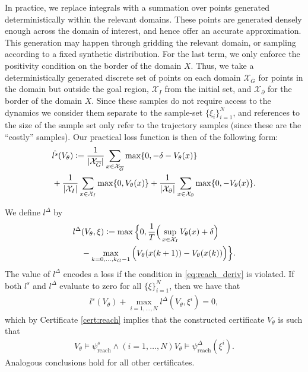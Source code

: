 In practice, we replace integrals with a summation over points generated deterministically within the relevant domains. 
These points are generated densely enough across the domain of interest, and hence offer an accurate approximation. 
This generation may happen through gridding the relevant domain, or sampling according to a fixed synthetic distribution.
For the last term, we only enforce the positivity condition on the border of the domain $X$.
Thus, we take a deterministically generated discrete set of points on each domain $\mathcal{X}_{\overline{G}}$ for points in the domain but outside the goal region, $\mathcal{X}_I$ from the initial set, and $\mathcal{X}_\partial$ for the border of the domain $X$.
Since these samples do not require access to the dynamics we consider them separate to the sample-set $\{\xi_i\}_{i=1}^N$, and references to the size of the sample set only refer to the trajectory samples (since these are the ``costly'' samples).
Our practical loss function is then of the following form: 
\begin{align}
    &\hat{l^s}(V_\theta) \vcentcolon=  \frac{1}{|\mathcal{X}_{\overline{G}}|}\sum_{x \in \mathcal{X}_{\overline{G}}} \max\{0, -\delta-V_\theta(x)\} \\ &+\frac{1}{|\mathcal{X}_I|}\sum_{x \in \mathcal{X}_I}\max\{0,V_\theta(x)\}+\frac{1}{|\mathcal{X}_\partial|}\sum_{x \in \mathcal{X}_\partial} \max\{0,-V_\theta(x)\}.\nonumber
    \end{align}

We define $l^\Delta$ by
\begin{equation}
\label{eq:c_deriv}
        \begin{aligned}            
        l^\Delta&(V_\theta, \xi) \vcentcolon= \max \Big \{ 0, \frac{1}{T} \Big (\sup_{x\in \mathcal{X}_I} V_\theta(x) + \delta \Big )\\&-\max_{k=0,\dots,k_G-1} \Big ( V_\theta(x(k+1))-V_\theta(x(k)) \Big ) \Big \}.
        \end{aligned}
\end{equation}
The value of $l^\Delta$ encodes a loss if the condition in \eqref{eq:reach_deriv} is violated.
If both $l^s$ and $l^\Delta$ evaluate to zero for all $\{\xi\}_{i=1}^N$, then we have that 
\begin{equation}
\begin{aligned}
        l^s(V_\theta) + \max_{i = 1, \dots, N} l^\Delta(V_\theta, \xi^i) = 0,
\end{aligned}
\end{equation}
which by Certificate \ref{cert:reach} implies that the constructed certificate $V_\theta$ is such that
\begin{equation}
\begin{aligned}
        V_\theta \models \psi^s_\text{reach} \wedge (i=1,\dots,N) V_\theta \models\psi^\Delta_\text{reach}(\xi^i).
\end{aligned}
\end{equation}
Analogous conclusions hold for all other certificates.
